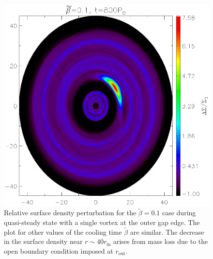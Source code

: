 
\begin{figure}
  \includegraphics[width=\linewidth,height=\linewidth]{figures/vortex2D}
  \caption{Relative surface density perturbation for the
    $\tilde\beta=0.1$ case during quasi-steady state with a single
    vortex at the outer gap edge. The plot for other values of the cooling time
    $\tilde{\beta}$ are similar. The decrease in the surface
      density near $r\sim 40 r_\mathrm{in}$ arises from mass loss due to the open
      boundary condition imposed at $r_\mathrm{out}$.
    \label{Vortex2D} }
\end{figure}



